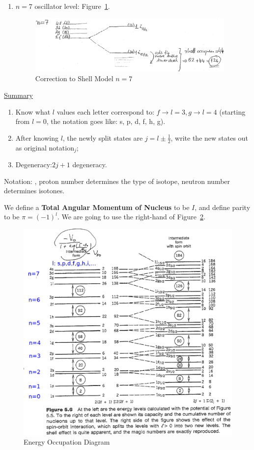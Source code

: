 \documentclass{school-22.101-notes}
\begin{document}
\begin{enumerate}
\item $n=7$ oscillator level: Figure~\ref{shell-126}.
\begin{figure}
    \centering
    \includegraphics[width=4in]{images/shell/magic-number-126.png}
    \caption{Correction to Shell Model $n=7$\label{shell-126}}
\end{figure}
\end{enumerate}

\uline{Summary}
\begin{enumerate}
\item Know what $l$ values each letter correspond to: $ f \to l=3, g \to l=4$ (starting from $l=0$, the notation goes like: s, p, d, f, h, g). 
\item After knowing $l$, the newly split states are $j= l \pm \frac{1}{2}$, write the new states out as original notation$_{j}$;
\item Degeneracy:$2 j+1$ degeneracy.  
\end{enumerate}


Notation: , proton number determines the type of isotope, neutron number determines isotones.  

We define a \textbf{Total Angular Momentum of Nucleus} to be $I$, and define parity to be $\pi = (-1)^l$. We are going to use the right-hand of Figure~\ref{ns-magic-numbers}.
\begin{figure}[ht]
    \centering
    \includegraphics[width=5in]{images/ns/magic-numbers.png}
    \caption{Energy Occupation Diagram}
    \label{ns-magic-numbers}
\end{figure}
\end{document}
